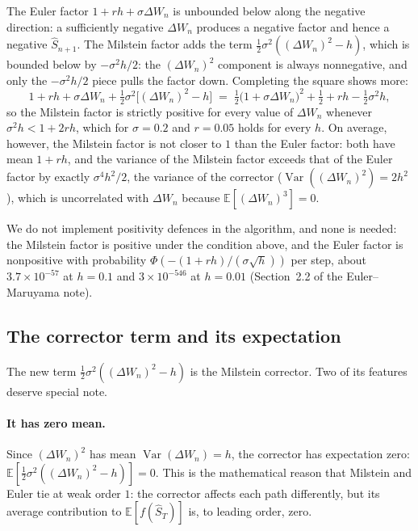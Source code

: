 \documentclass[11pt,a4paper]{article}
\theoremstyle{plain}
\theoremstyle{definition}
\theoremstyle{remark}
\newcommand{\E}{\mathbb{E}}
\newcommand{\Var}{\operatorname{Var}}
\begin{document}
The Euler factor $1 + r h + \sigma \Delta W_n$ is unbounded below
along the negative direction: a sufficiently negative $\Delta W_n$
produces a negative factor and hence a negative $\hat S_{n+1}$. The
Milstein factor adds the term $\tfrac{1}{2} \sigma^2 ((\Delta W_n)^2
- h)$, which is bounded below by $-\sigma^2 h / 2$: the
$(\Delta W_n)^2$ component is always nonnegative, and only the $-
\sigma^2 h / 2$ piece pulls the factor down. Completing the square
shows more:
\begin{equation}
1 + r h + \sigma \Delta W_n + \tfrac{1}{2} \sigma^2 \big[(\Delta W_n)^2 - h\big]
\;=\; \tfrac{1}{2} \big(1 + \sigma \Delta W_n\big)^2
+ \tfrac{1}{2} + r h - \tfrac{1}{2} \sigma^2 h,
\end{equation}
so the Milstein factor is strictly positive for every value of
$\Delta W_n$ whenever $\sigma^2 h < 1 + 2 r h$, which for $\sigma = 0.2$
and $r = 0.05$ holds for every $h$. On average, however, the Milstein factor is not closer to $1$ than
the Euler factor: both have mean $1 + r h$, and the variance of the
Milstein factor exceeds that of the Euler factor by exactly
$\sigma^4 h^2 / 2$, the variance of the corrector
($\Var((\Delta W_n)^2) = 2h^2$), which is uncorrelated with
$\Delta W_n$ because $\E[(\Delta W_n)^3] = 0$.

We do not implement positivity defences in the algorithm, and none is
needed: the Milstein factor is positive under the condition above, and
the Euler factor is nonpositive with probability
$\Phi(-(1 + r h)/(\sigma\sqrt{h}))$ per step, about
$3.7 \times 10^{-57}$ at $h = 0.1$ and $3 \times 10^{-546}$ at
$h = 0.01$ (Section~2.2 of the Euler--Maruyama note).

\subsection{The corrector term and its expectation}

The new term $\tfrac{1}{2} \sigma^2 ((\Delta W_n)^2 - h)$ is the
Milstein corrector. Two of its features deserve special note.

\paragraph{It has zero mean.} Since $(\Delta W_n)^2$ has mean
$\Var(\Delta W_n) = h$, the corrector has expectation zero:
$\E[\tfrac{1}{2} \sigma^2 ((\Delta W_n)^2 - h)] = 0$. This is the
mathematical reason that Milstein and Euler tie at weak order $1$:
the corrector affects each path differently, but its average
contribution to $\E[f(\hat S_T)]$ is, to leading order, zero.
\end{document}
